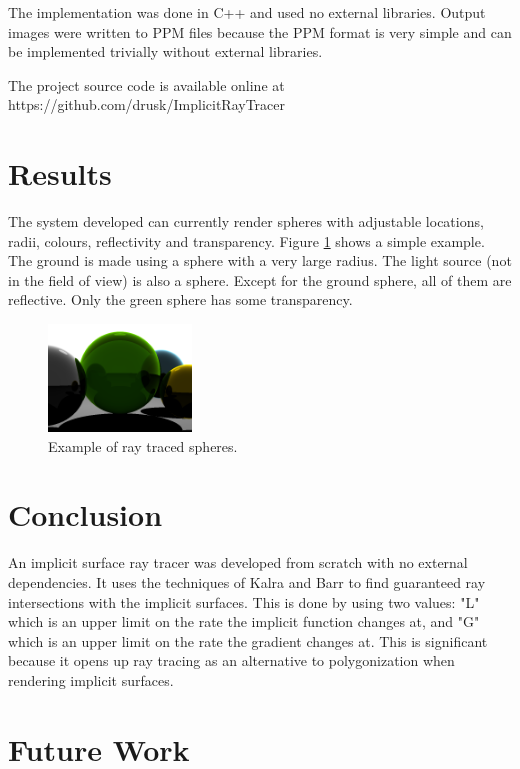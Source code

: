 \documentclass[conference]{acmsiggraph}
\begin{document}
The implementation was done in C++ and used no external libraries.  Output 
images were written to PPM \cite{PPM} files because the PPM format is 
very simple and can be implemented trivially without external libraries.

The project source code is available online at 
https://github.com/drusk/ImplicitRayTracer

\section{Results}

The system developed can currently render spheres with adjustable locations,
radii, colours, reflectivity and transparency.  Figure \ref{fig:spheres} shows a
simple example.  The ground is made using a sphere with a very large radius.
The light source (not in the field of view) is also a sphere.  Except for the
ground sphere, all of them are reflective.  Only the green sphere has some
transparency.

\begin{figure}[ht]
  \centering
  \includegraphics[width=1.5in]{figures/spheres.png}
  \caption{Example of ray traced spheres.}
  \label{fig:spheres}
\end{figure}

\section{Conclusion}

An implicit surface ray tracer was developed from scratch with no external
dependencies.  It uses the techniques of Kalra and Barr \cite{KalraBarr1989}
to find guaranteed ray intersections with the implicit surfaces.  This is done
by using two values: "L" which is an upper limit on the rate the implicit
function changes at, and "G" which is an upper limit on the rate the gradient
changes at.  This is significant because it opens up ray tracing as an 
alternative to polygonization when rendering implicit surfaces.

\section{Future Work}
\end{document}
